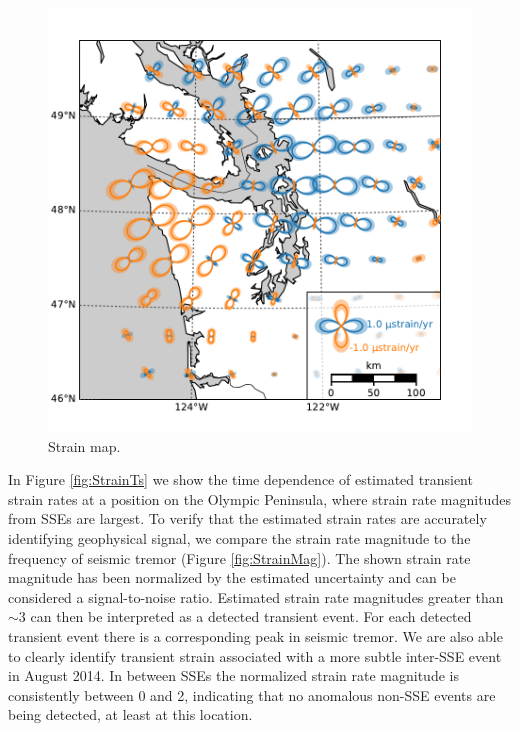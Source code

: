 \documentclass[10pt,a4paper]{article}
\begin{document}
\begin{figure}
\includegraphics{figures/strain_map/strain-map.pdf}
\caption{Strain map.}   
\label{fig:StrainMap}
\end{figure}

In Figure \ref{fig:StrainTs} we show the time dependence of estimated transient strain rates at a position on the Olympic Peninsula, where strain rate magnitudes from SSEs are largest. To verify that the estimated strain rates are accurately identifying geophysical signal, we compare the strain rate magnitude to the frequency of seismic tremor (Figure \ref{fig:StrainMag}). The shown strain rate magnitude has been normalized by the estimated uncertainty and can be considered a signal-to-noise ratio. Estimated strain rate magnitudes greater than ${\sim}3$ can then be interpreted as a detected transient event. For each detected transient event there is a corresponding peak in seismic tremor. We are also able to clearly identify transient strain associated with a more subtle inter-SSE event in August 2014. In between SSEs the normalized strain rate magnitude is consistently between 0 and 2, indicating that no anomalous non-SSE events are being detected, at least at this location. 
\end{document}

